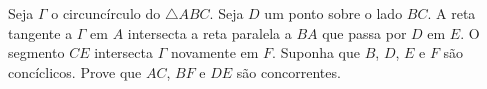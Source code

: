 Seja $\Gamma$ o circuncírculo do $\triangle ABC$. Seja $D$ um ponto sobre o lado $BC$. A reta tangente a $\Gamma$ em $A$ intersecta a reta paralela a $BA$ que passa por $D$ em $E$. O segmento $CE$ intersecta $\Gamma$ novamente em $F$. Suponha que $B$, $D$, $E$ e $F$ são concíclicos. Prove que $AC$, $BF$ e $DE$ são concorrentes.
